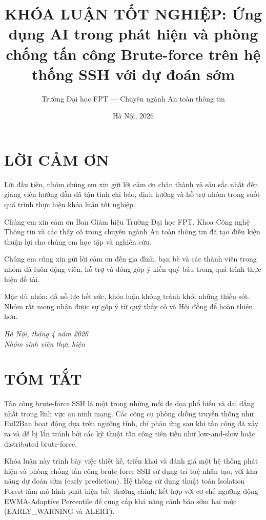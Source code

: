 \documentclass[
  a4paper]{report}
\title{KHÓA LUẬN TỐT NGHIỆP: Ứng dụng AI trong phát hiện và phòng chống
tấn công Brute-force trên hệ thống SSH với dự đoán sớm}
\author{Trường Đại học FPT --- Chuyên ngành An toàn thông tin}
\date{Hà Nội, 2026}
\begin{document}
\maketitle

{
\setcounter{tocdepth}{2}
\tableofcontents
}
\newpage

\chapter*{LỜI CẢM ƠN}\label{lux1eddi-cux1ea3m-ux1a1n}

Lời đầu tiên, nhóm chúng em xin gửi lời cảm ơn chân thành và sâu sắc
nhất đến giảng viên hướng dẫn đã tận tình chỉ bảo, định hướng và hỗ trợ
nhóm trong suốt quá trình thực hiện khóa luận tốt nghiệp.

Chúng em xin cảm ơn Ban Giám hiệu Trường Đại học FPT, Khoa Công nghệ
Thông tin và các thầy cô trong chuyên ngành An toàn thông tin đã tạo
điều kiện thuận lợi cho chúng em học tập và nghiên cứu.

Chúng em cũng xin gửi lời cảm ơn đến gia đình, bạn bè và các thành viên
trong nhóm đã luôn động viên, hỗ trợ và đóng góp ý kiến quý báu trong
quá trình thực hiện đề tài.

Mặc dù nhóm đã nỗ lực hết sức, khóa luận không tránh khỏi những thiếu
sót. Nhóm rất mong nhận được sự góp ý từ quý thầy cô và Hội đồng để hoàn
thiện hơn.

\begin{flushright}
\textit{Hà Nội, tháng 4 năm 2026}\\
\textit{Nhóm sinh viên thực hiện}
\end{flushright}

\newpage

\chapter*{TÓM TẮT}\label{tuxf3m-tux1eaft}

Tấn công brute-force SSH là một trong những mối đe dọa phổ biến và dai
dẳng nhất trong lĩnh vực an ninh mạng. Các công cụ phòng chống truyền
thống như Fail2Ban hoạt động dựa trên ngưỡng tĩnh, chỉ phản ứng sau khi
tấn công đã xảy ra và dễ bị lẩn tránh bởi các kỹ thuật tấn công tiên
tiến như low-and-slow hoặc distributed brute-force.

Khóa luận này trình bày việc thiết kế, triển khai và đánh giá một hệ
thống phát hiện và phòng chống tấn công brute-force SSH sử dụng trí tuệ
nhân tạo, với khả năng dự đoán sớm (early prediction). Hệ thống sử dụng
thuật toán Isolation Forest làm mô hình phát hiện bất thường chính, kết
hợp với cơ chế ngưỡng động EWMA-Adaptive Percentile để cung cấp khả năng
cảnh báo sớm hai mức (EARLY\_WARNING và ALERT).
\end{document}
